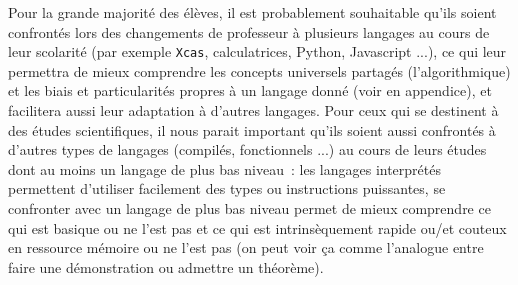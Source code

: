 \documentclass[12pt,a4paper]{book}
\begin{document}
\begin{giacjshere}
Pour la grande majorit\'e des \'el\`eves, il est probablement souhaitable 
qu'ils soient confront\'es lors des changements de professeur
\`a plusieurs langages au cours de leur scolarit\'e
(par exemple {\tt Xcas}, calculatrices, Python, Javascript ...),
ce qui leur permettra de mieux comprendre les concepts universels partag\'es 
(l'algorithmique) et les biais et particularit\'es propres \`a un langage 
donn\'e (voir en appendice), et facilitera aussi leur adaptation \`a d'autres 
langages. Pour ceux qui se destinent \`a des \'etudes scientifiques, il nous 
parait important qu'ils soient aussi confront\'es \`a d'autres types de langages
(compil\'es, fonctionnels ...) au cours de leurs \'etudes
dont au moins un langage de plus bas
niveau~: les langages interpr\'et\'es permettent d'utiliser
facilement des types ou instructions puissantes,
se confronter avec un langage de plus bas niveau permet
de mieux comprendre ce qui est basique ou ne l'est pas
et ce qui est intrins\`equement rapide ou/et couteux en ressource
m\'emoire ou ne l'est pas (on peut voir \c{c}a comme l'analogue entre
faire une d\'emonstration ou admettre un th\'eor\`eme).


\end{giacjshere}
\end{document}
